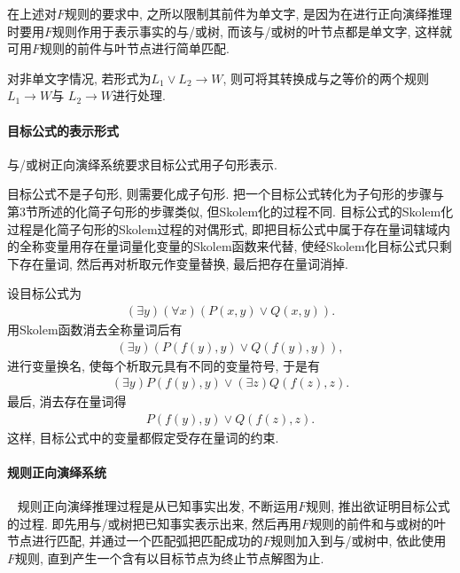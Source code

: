 \begin{remark}
    在上述对$F$规则的要求中, 之所以限制其前件为单文字, 是因为在进行正向演绎推理时要用$F$规则作用于表示事实的与/或树, 而该与/或树的叶节点都是单文字, 这样就可用$F$规则的前件与叶节点进行简单匹配.

    对非单文字情况, 若形式为$L_1\vee L_2\rightarrow W$, 则可将其转换成与之等价的两个规则$L_1\rightarrow W$与 $L_2\rightarrow W$进行处理.
\end{remark}
\paragraph{目标公式的表示形式}
    与/或树正向演绎系统要求目标公式用子句形表示.

    目标公式不是子句形, 则需要化成子句形. 把一个目标公式转化为子句形的步骤与第3节所述的化简子句形的步骤类似, 但Skolem化的过程不同. 目标公式的Skolem化过程是化简子句形的Skolem过程的对偶形式, 即把目标公式中属于存在量词辖域内的全称变量用存在量词量化变量的Skolem函数来代替, 使经Skolem化目标公式只剩下存在量词, 然后再对析取元作变量替换, 最后把存在量词消掉.
\begin{example}
设目标公式为
\begin{align}
    (\exists  y) (\forall x) (P(x, y)\vee Q(x, y)).
\end{align}
用Skolem函数消去全称量词后有
\begin{align}
    (\exists  y)(P(f(y), y)\vee Q(f(y), y)),
\end{align}
进行变量换名, 使每个析取元具有不同的变量符号, 于是有
\begin{align}
    (\exists  y)P(f(y), y)\vee (\exists  z)Q(f(z), z).
\end{align}
最后, 消去存在量词得
\begin{align}
    P(f(y), y)\vee Q(f(z), z).
\end{align}
这样, 目标公式中的变量都假定受存在量词的约束.
\end{example}
\paragraph{规则正向演绎系统}~{}
    规则正向演绎推理过程是从已知事实出发, 不断运用$F$规则, 推出欲证明目标公式的过程. 即先用与/或树把已知事实表示出来, 然后再用$F$规则的前件和与或树的叶节点进行匹配, 并通过一个匹配弧把匹配成功的$F$规则加入到与/或树中, 依此使用$F$规则, 直到产生一个含有以目标节点为终止节点解图为止.


